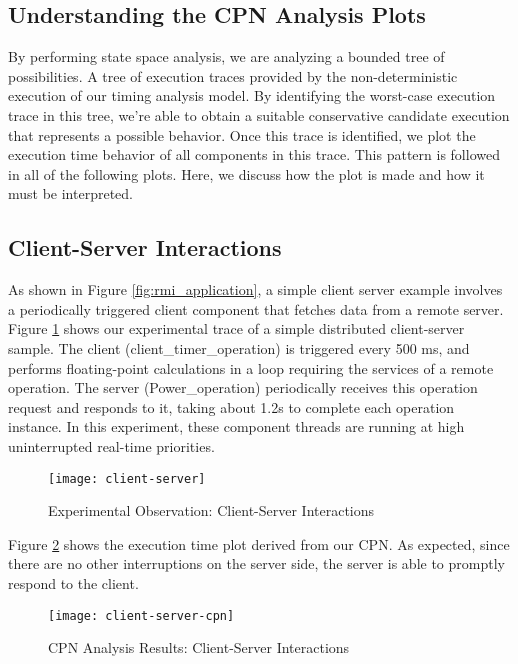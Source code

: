 \subsection{Understanding the CPN Analysis Plots}

By performing state space analysis, we are analyzing a bounded tree of possibilities. A tree of execution traces provided by the non-deterministic execution of our timing analysis model. By identifying the worst-case execution trace in this tree, we're able to obtain a suitable conservative candidate execution that represents a possible behavior. Once this trace is identified, we plot the execution time behavior of all components in this trace. This pattern is followed in all of the following plots. Here, we discuss how the plot is made and how it must be interpreted. 

\subsection{Client-Server Interactions}

As shown in Figure \ref{fig:rmi_application}, a simple client server example involves a periodically triggered client component that fetches data from a remote server. Figure \ref{fig:client-server} shows our experimental trace of a simple distributed client-server sample. The client (client\_timer\_operation) is triggered every 500 ms, and performs floating-point calculations in a loop requiring the services of a remote operation.  %
The server (Power\_operation) periodically receives this operation request and responds to it, taking about 1.2s to complete each operation instance. In this experiment, these component threads are running at high uninterrupted real-time priorities. 

\begin{figure}[h]
	\centering
	\texttt{[image: client-server]}
	\caption{Experimental Observation: Client-Server Interactions}
	\label{fig:client-server}
\end{figure}
\FloatBarrier

Figure \ref{fig:client-server-cpn} shows the execution time plot derived from our CPN. As expected, since there are no other interruptions on the server side, the server is able to promptly respond to the client.

\begin{figure}[h]
	\centering
	\texttt{[image: client-server-cpn]}
	\caption{CPN Analysis Results: Client-Server Interactions}
	\label{fig:client-server-cpn}
\end{figure}
\FloatBarrier

